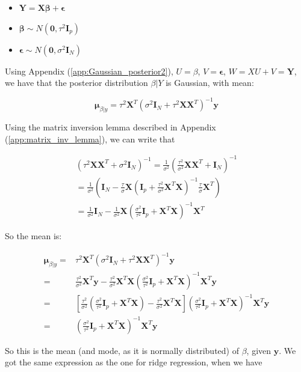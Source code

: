 \documentclass{article}
\begin{document}
\begin{itemize}
    \item $\bm{Y} = \bm{X}\bm{\beta} + \bm{\epsilon}$
    \item $\bm{\beta} \sim N(\bm{0}, \tau^2 \bm{I}_p)$
    \item $\bm{\epsilon} \sim N(\bm{0}, \sigma^2 \bm{I}_N)$
\end{itemize}

Using Appendix (\ref{app:Gaussian_posterior2}), $U=\beta$, $V=\bm{\epsilon}$, $W=XU+V=\bm{Y}$, we have that the posterior distribution $\beta | Y$ is Gaussian, with mean:

\[
\bm{\mu}_{\beta|y} = \tau^2 \bm{X}^T (\sigma^2 \bm{I}_N + \tau^2 \bm{X} \bm{X}^T)^{-1}\bm{y}
\]

Using the matrix inversion lemma described in Appendix (\ref{app:matrix_inv_lemma}), we can write that

\[
\begin{split}
(\tau^2\bm{X}\bm{X}^T + \sigma^2 \bm{I}_N)^{-1} = \frac{1}{\sigma^2}\left(\frac{\tau^2}{\sigma^2}\bm{X}\bm{X}^T + \bm{I}_N\right)^{-1}\\ =\frac{1}{\sigma^2}\left( \bm{I}_N - \frac{\tau}{\sigma} \bm{X}\left(\bm{I}_p + \frac{\tau^2}{\sigma^2}\bm{X}^T\bm{X}\right)^{-1}\frac{\tau}{\sigma}\bm{X}^T \right)\\
=\frac{1}{\sigma^2} \bm{I}_N - \frac{1}{\sigma^2} \bm{X}\left(\frac{\sigma^2}{\tau^2}\bm{I}_p + \bm{X}^T\bm{X}\right)^{-1}\bm{X}^T
\end{split}
\]

So the mean is:

\[
\begin{split}
\bm{\mu}_{\beta|y} =& \tau^2 \bm{X}^T (\sigma^2 \bm{I}_N + \tau^2 \bm{X} \bm{X}^T)^{-1}\bm{y}\\
=& \frac{\tau^2}{\sigma^2} \bm{X}^T\bm{y} - \frac{\tau^2}{\sigma^2}\bm{X}^T \bm{X}\left(\frac{\sigma^2}{\tau^2}\bm{I}_p + \bm{X}^T\bm{X}\right)^{-1}\bm{X}^T\bm{y}\\
=& \left[\frac{\tau^2}{\sigma^2} \left(\frac{\sigma^2}{\tau^2}\bm{I}_p + \bm{X}^T\bm{X}\right) - \frac{\tau^2}{\sigma^2}\bm{X}^T \bm{X}\right]\left(\frac{\sigma^2}{\tau^2}\bm{I}_p + \bm{X}^T\bm{X}\right)^{-1}\bm{X}^T\bm{y}\\
=& \left(\frac{\sigma^2}{\tau^2}\bm{I}_p + \bm{X}^T\bm{X}\right)^{-1}\bm{X}^T\bm{y}
\end{split}
\]

So this is the mean (and mode, as it is normally distributed) of $\beta$, given $\mathbf{y}$. We got the same expression as the one for ridge regression, when we have
\end{document}
